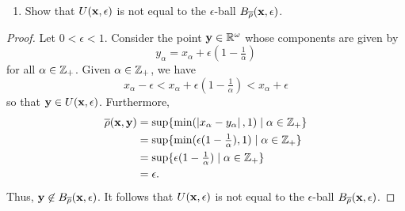 \begin{solution}
  \begin{enumerate}[label={(\alph*)}, align=left, leftmargin=\parindent, listparindent=\parindent, labelwidth=0pt, itemindent=!]
    \item Show that $U(\mathbf{x}, \epsilon)$ is not equal to the $\epsilon$-ball $B_{\overline{\rho}}(\mathbf{x}, \epsilon)$.
  \end{enumerate}
  \begin{proof}
    Let $0 < \epsilon < 1$.
    Consider the point $\mathbf{y} \in \mathbb{R}^\omega$ whose components are given by
    \begin{equation*}
      y_\alpha = x_\alpha + \epsilon (1 - \tfrac{1}{\alpha})
    \end{equation*}
    for all $\alpha \in \mathbb{Z}_+$.
    Given $\alpha \in \mathbb{Z}_+$, we have
    \begin{equation*}
      x_\alpha - \epsilon < x_\alpha + \epsilon (1 - \tfrac{1}{\alpha}) < x_\alpha + \epsilon
    \end{equation*}
    so that $\mathbf{y} \in U(\mathbf{x}, \epsilon)$.
    Furthermore,
    \begin{align*}
      \overline{\rho}(\mathbf{x}, \mathbf{y}) &= \sup\{ \min(\left| x_\alpha - y_\alpha \right|, 1) \mid \alpha \in \mathbb{Z}_+ \} \\
                                &= \sup\{ \min(\epsilon (1 - \tfrac{1}{\alpha}), 1) \mid \alpha \in \mathbb{Z}_+ \} \\
                                &= \sup\{ \epsilon (1 - \tfrac{1}{\alpha}) \mid \alpha \in \mathbb{Z}_+ \} \\
                                &= \epsilon.
    \end{align*}
    Thus, $\mathbf{y} \not\in B_{\overline{\rho}}(\mathbf{x}, \epsilon)$.
    It follows that $U(\mathbf{x}, \epsilon)$ is not equal to the $\epsilon$-ball $B_{\overline{\rho}}(\mathbf{x}, \epsilon)$.
  \end{proof}
  \bigskip


\end{solution}
